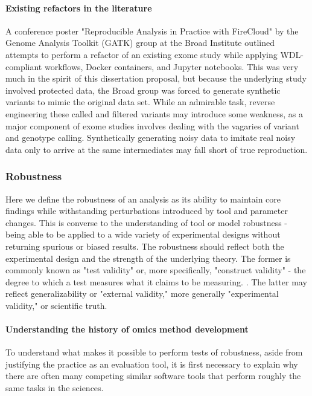 \documentclass{drexelthesis}
\begin{document}
\paragraph{Existing refactors in the literature}

A conference poster "Reproducible Analysis in Practice with FireCloud" by the Genome Analysis Toolkit (GATK) group at the Broad Institute outlined attempts to perform a refactor of an existing exome study while applying WDL-compliant workflows, Docker containers, and Jupyter notebooks. This was very much in the spirit of this dissertation proposal, but because the underlying study involved protected data, the Broad group was forced to generate synthetic variants to mimic the original data set. While an admirable task, reverse engineering these called and filtered variants may introduce some weakness, as a major component of exome studies involves dealing with the vagaries of variant and genotype calling. Synthetically generating noisy data to imitate real noisy data only to arrive at the same intermediates may fall short of true reproduction.

\subsubsection{Robustness}

Here we define the robustness of an analysis as its ability to maintain core findings while withstanding perturbations introduced by tool and parameter changes. This is converse to the understanding of tool or model robustness - being able to be applied to a wide variety of experimental designs without returning spurious or biased results. The robustness should reflect both the experimental design and the strength of the underlying theory. The former is commonly known as "test validity" or, more specifically, "construct validity" - the degree to which a test measures what it claims to be measuring. \cite{OLeary-Kelly1998-ll}. The latter may reflect generalizability or "external validity," more generally "experimental validity," or scientific truth.

\paragraph{Understanding the history of omics method development}

To understand what makes it possible to perform tests of robustness, aside from justifying the practice as an evaluation tool, it is first necessary to explain why there are often many competing similar software tools that perform roughly the same tasks in the sciences. 
\end{document}
